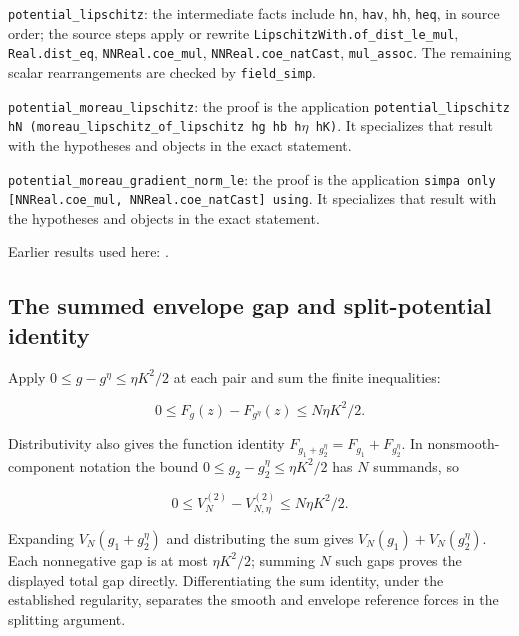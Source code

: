 \documentclass[11pt,a4paper]{report}
\begin{document}
\begin{leanbox}
\texttt{potential\_\allowbreak{}lipschitz}: the intermediate facts include \texttt{hn}, \texttt{hav}, \texttt{hh}, \texttt{heq}, in source order; the source steps apply or rewrite \texttt{Lipschitz\allowbreak{}With.\allowbreak{}of\_\allowbreak{}dist\_\allowbreak{}le\_\allowbreak{}mul}, \texttt{Real.\allowbreak{}dist\_\allowbreak{}eq}, \texttt{NNReal.\allowbreak{}coe\_\allowbreak{}mul}, \texttt{NNReal.\allowbreak{}coe\_\allowbreak{}nat\allowbreak{}Cast}, \texttt{mul\_\allowbreak{}assoc}. The remaining scalar rearrangements are checked by \texttt{field\_\allowbreak{}simp}.



\texttt{potential\_\allowbreak{}moreau\_\allowbreak{}lipschitz}: the proof is the application \texttt{potential\_\allowbreak{}lipschitz h\allowbreak{}N (moreau\_\allowbreak{}lipschitz\_\allowbreak{}of\_\allowbreak{}lipschitz hg hb h\ensuremath{\eta} h\allowbreak{}K)}. It specializes that result with the hypotheses and objects in the exact statement.



\texttt{potential\_\allowbreak{}moreau\_\allowbreak{}gradient\_\allowbreak{}norm\_\allowbreak{}le}: the proof is the application \texttt{simpa only [NNReal.\allowbreak{}coe\_\allowbreak{}mul, NNReal.\allowbreak{}coe\_\allowbreak{}nat\allowbreak{}Cast] using}. It specializes that result with the hypotheses and objects in the exact statement.
\end{leanbox}


Earlier results used here: \cite[Section~3.1.1]{LangevinLean2026IPLA}.
\subsection{\texorpdfstring{The summed envelope gap and split-potential identity}{The summed envelope gap and split-potential identity}}
\label{report-step-ProximalLangevin-ParticleSmoothing-lean-2}


Apply \(0\le g-g^\eta\le\eta K^2/2\) at each pair and sum the finite inequalities:

\[0\le F_g(z)-F_{g^\eta}(z)\le N\eta K^2/2.\]

Distributivity also gives the function identity \(F_{g_1+g_2^\eta}=F_{g_1}+F_{g_2^\eta}\). In nonsmooth-component notation the bound \(0\le g_2-g_2^\eta\le\eta K^2/2\) has \(N\) summands, so

\[0\le V_N^{(2)}-V_{N,\eta}^{(2)}\le N\eta K^2/2.\]

Expanding \(V_N(g_1+g_2^\eta)\) and distributing the sum gives \(V_N(g_1)+V_N(g_2^\eta)\). Each nonnegative gap is at most \(\eta K^2/2\); summing \(N\) such gaps proves the displayed total gap directly. Differentiating the sum identity, under the established regularity, separates the smooth and envelope reference forces in the splitting argument.
\end{document}
